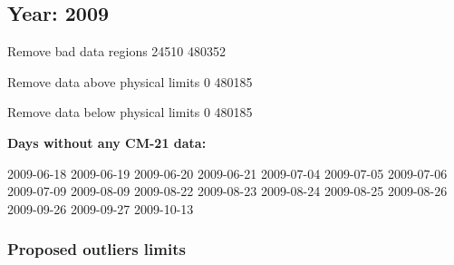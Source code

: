 \documentclass[
  10pt,
  a4paper,oneside]{article}
\begin{document}
\FloatBarrier

\newpage

\hypertarget{year-2009}{%
\subsection{Year: 2009}\label{year-2009}}

Remove bad data regions
24510 480352

Remove data above physical limits
0 480185

Remove data below physical limits
0 480185

\textbf{Days without any CM-21 data:}

2009-06-18 2009-06-19 2009-06-20 2009-06-21 2009-07-04 2009-07-05 2009-07-06 2009-07-09 2009-08-09 2009-08-22 2009-08-23 2009-08-24 2009-08-25 2009-08-26 2009-09-26 2009-09-27 2009-10-13

\hypertarget{proposed-outliers-limits-16}{%
\subsubsection{Proposed outliers limits}\label{proposed-outliers-limits-16}}

\footnotesize
\end{document}
